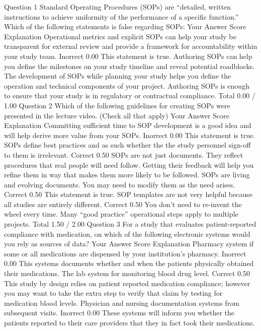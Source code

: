 Question 1
Standard Operating Procedures (SOPs) are “detailed, written instructions to achieve uniformity of the performance of a specific function.” Which of the following statements is false regarding SOPs:
Your Answer		Score	Explanation
Operational metrics and explicit SOPs can help your study be transparent for external review and provide a framework for accountability within your study team.	Inorrect	0.00	This statement is true.
Authoring SOPs can help you define the milestones on your study timeline and reveal potential roadblocks.			
The development of SOPs while planning your study helps you define the operation and technical components of your project.			
Authoring SOPs is enough to ensure that your study is in regulatory or contractual compliance.			
Total		0.00 / 1.00	
Question 2
Which of the following guidelines for creating SOPs were presented in the lecture video. (Check all that apply)
Your Answer		Score	Explanation
Committing sufficient time to SOP development is a good idea and will help derive more value from your SOPs.	Inorrect	0.00	This statement is true.
SOPs define best practices and as such whether the the study personnel sign-off to them is irrelevant.	Correct	0.50	SOPs are not just documents. They reflect procedures that real people will need follow. Getting their feedback will help you refine them in way that makes them more likely to be followed.
SOPs are living and evolving documents. You may need to modify them as the need arises.	Correct	0.50	This statement is true.
SOP templates are not very helpful because all studies are entirely different.	Correct	0.50	You don’t need to re-invent the wheel every time. Many “good practice” operational steps apply to multiple projects.
Total		1.50 / 2.00	
Question 3
For a study that evaluates patient-reported compliance with medication, on which of the following electronic systems would you rely as sources of data?
Your Answer		Score	Explanation
Pharmacy system if some or all medications are dispensed by your institution’s pharmacy.	Inorrect	0.00	This systems documents whether and when the patients physically obtained their medications.
The lab system for monitoring blood drug level.	Correct	0.50	This study by design relies on patient reported medication compliance; however you may want to take the extra step to verify that claim by testing for medication blood levels.
Physician and nursing documentation systems from subsequent visits.	Inorrect	0.00	These systems will inform you whether the patients reported to their care providers that they in fact took their medications.
